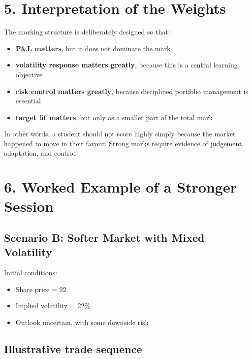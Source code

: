 \documentclass[11pt,a4paper]{article}
\begin{document}
\section*{5. Interpretation of the Weights}

The marking structure is deliberately designed so that:
\begin{itemize}[leftmargin=1.5em]
\item \textbf{P\&L matters}, but it does not dominate the mark
\item \textbf{volatility response matters greatly}, because this is a central learning objective
\item \textbf{risk control matters greatly}, because disciplined portfolio management is essential
\item \textbf{target fit matters}, but only as a smaller part of the total mark
\end{itemize}

In other words, a student should not score highly simply because the market happened to move in their favour. Strong marks require evidence of judgement, adaptation, and control.

\section*{6. Worked Example of a Stronger Session}

\subsection*{Scenario B: Softer Market with Mixed Volatility}

Initial conditions:
\begin{itemize}[leftmargin=1.5em]
\item Share price = 92
\item Implied volatility = 22\%
\item Outlook uncertain, with some downside risk
\end{itemize}

\subsection*{Illustrative trade sequence}
\end{document}
